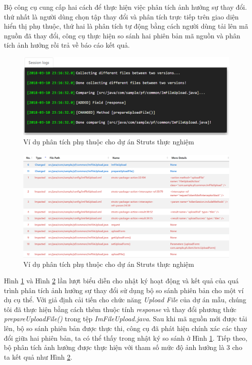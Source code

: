 \documentclass[12pt]{report}
\begin{document}
Bộ công cụ cung cấp hai cách để thực hiện việc phân tích ảnh hưởng sự thay đổi. thứ nhất là người dùng chọn tập thay đổi và phân tích trực tiếp trên giao diện hiển thị phụ thuộc, thứ hai là phân tích tự động bằng cách người dùng tải lên mã nguồn đã thay đổi, công cụ thực hiện so sánh hai phiên bản mã nguồn và phân tích ảnh hưởng rồi trả về báo cáo kết quả.

\begin{figure}[h]
	\centering
	\includegraphics[width=0.8\linewidth]{images/sample-vitm-1}
	\caption{Ví dụ phân tích phụ thuộc cho dự án Struts thực nghiệm}
	\label{fig:sample-vitm-1}
\end{figure}

\begin{figure}[h]
	\centering
	\includegraphics[width=0.9\linewidth]{images/sample-vitm-2}
	\caption{Ví dụ phân tích phụ thuộc cho dự án Struts thực nghiệm}
	\label{fig:sample-vitm-2}
\end{figure}

Hình \ref{fig:sample-vitm-1} và Hình \ref{fig:sample-vitm-2} lần lượt biểu diễn cho nhật ký hoạt động và kết quả của quá trình phân tích ảnh hưởng sự thay đổi sử dụng bộ so sánh phiên bản cho một ví dụ cụ thể. Với giả định cải tiến cho chức năng \textit{Upload File} của dự án mẫu, chúng tôi đã thực hiện bằng cách thêm thuộc tính \textit{response} và thay đổi phương thức \textit{prepareUploadFile()} trong tệp \textit{ImFileUpload.java}. Sau khi mã nguồn mới được tải lên, bộ so sánh phiên bản được thực thi, công cụ đã phát hiện chính xác các thay đổi giữa hai phiên bản, ta có thể thấy trong nhật ký so sánh ở Hình \ref{fig:sample-vitm-1}. Tiếp theo, bộ phân tích ảnh hưởng được thực hiện với tham số mức độ ảnh hưởng là 3 cho ta kết quả như Hình \ref{fig:sample-vitm-2}.
\end{document}
